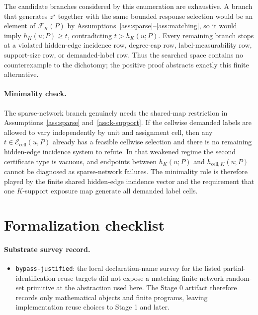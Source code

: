 \documentclass[11pt]{article}
\theoremstyle{definition}
\theoremstyle{plain}
\theoremstyle{remark}
\begin{document}
The candidate branches considered by this enumeration are exhaustive.  A branch that generates \(z^\star\) together with the same bounded response selection would be an element of \(\mathcal F_K(P)\) by Assumptions~\ref{ass:sparse}--\ref{ass:matching}, so it would imply \(h_K(u;P)\ge t\), contradicting \(t>h_K(u;P)\).  Every remaining branch stops at a violated hidden-edge incidence row, degree-cap row, label-measurability row, support-size row, or demanded-label row.  Thus the searched space contains no counterexample to the dichotomy; the positive proof abstracts exactly this finite alternative.

\paragraph{Minimality check.}
The sparse-network branch genuinely needs the shared-map restriction in Assumptions~\ref{ass:sparse} and~\ref{ass:k-support}.  If the cellwise demanded labels are allowed to vary independently by unit and assignment cell, then any \(t\in\mathcal E_{\mathrm{cell}}(u,P)\) already has a feasible cellwise selection and there is no remaining hidden-edge incidence system to refute.  In that weakened regime the second certificate type is vacuous, and endpoints between \(h_K(u;P)\) and \(h_{\mathrm{cell},K}(u;P)\) cannot be diagnosed as sparse-network failures.  The minimality role is therefore played by the finite shared hidden-edge incidence vector and the requirement that one \(K\)-support exposure map generate all demanded label cells.

\section{Formalization checklist}
\paragraph{Substrate survey record.}
\begin{itemize}[leftmargin=*]
  \item \texttt{bypass-justified}: the local declaration-name survey for the listed partial-identification reuse targets did not expose a matching finite network random-set primitive at the abstraction used here.  The Stage 0 artifact therefore records only mathematical objects and finite programs, leaving implementation reuse choices to Stage 1 and later.
\end{itemize}
\end{document}
